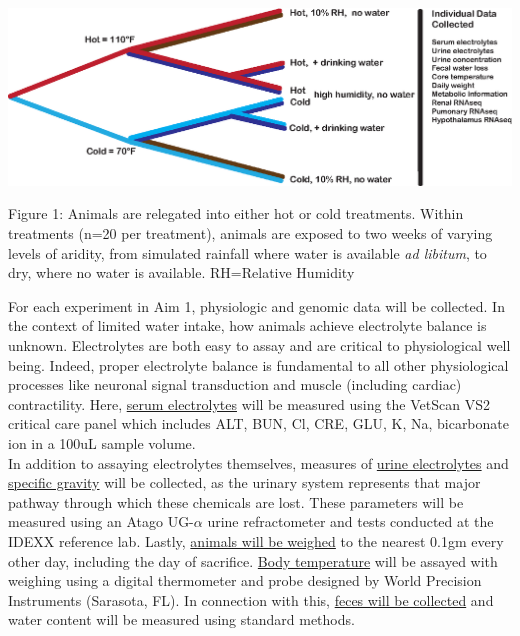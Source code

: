\documentclass[12pt]{article}
\begin{document}
\vspace{2mm}

\begin{mdframed}
 \begin{center}
  \includegraphics[width=1\textwidth]{exp_design_fig.eps}
 \end{center} 

\noindent \small{Figure 1: Animals are relegated into either hot or cold treatments. Within treatments (n=20 per treatment), animals are exposed to two weeks of varying levels of aridity, from simulated rainfall where water is available \textit{ad libitum}, to dry, where no water is available. RH=Relative Humidity}

\end{mdframed}

\vspace{5mm}


For each experiment in Aim 1, physiologic and genomic data will be collected. In the context of limited water intake, how animals achieve electrolyte balance is unknown. Electrolytes are both easy to assay and are critical to physiological well being. Indeed, proper electrolyte balance is fundamental to all other physiological processes like neuronal signal transduction and muscle (including cardiac) contractility. Here, \ul{serum electrolytes} will be measured using the VetScan VS2 critical care panel which includes ALT, BUN, Cl, CRE, GLU, K, Na, bicarbonate ion in a 100uL sample volume. \\

In addition to assaying electrolytes themselves, measures of \ul{urine electrolytes} and \ul{specific gravity} will be collected, as the urinary system represents that major pathway through which these chemicals are lost. These parameters will be measured using an Atago UG-$\alpha$ urine refractometer and tests conducted at the IDEXX reference lab. Lastly, \ul{animals will be weighed} to the nearest 0.1gm every other day, including the day of sacrifice. \ul{Body temperature} will be assayed with weighing using a digital thermometer and probe designed by World Precision Instruments (Sarasota, FL). In connection with this, \ul{feces will be collected} and water content will be measured using standard methods. \\
\end{document}
